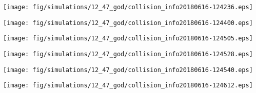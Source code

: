 \texttt{[image: fig/simulations/12\_47\_god/collision\_info20180616-124236.eps]}

\texttt{[image: fig/simulations/12\_47\_god/collision\_info20180616-124400.eps]}

\texttt{[image: fig/simulations/12\_47\_god/collision\_info20180616-124505.eps]}

\texttt{[image: fig/simulations/12\_47\_god/collision\_info20180616-124528.eps]}

\texttt{[image: fig/simulations/12\_47\_god/collision\_info20180616-124540.eps]}

\texttt{[image: fig/simulations/12\_47\_god/collision\_info20180616-124612.eps]}

